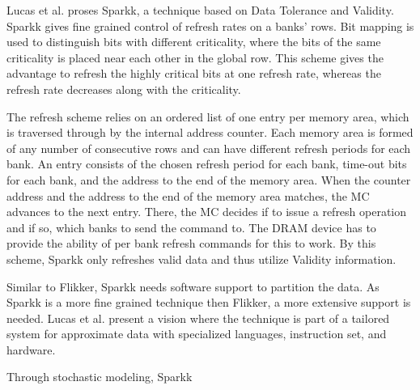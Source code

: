 Lucas et al. \cite{sparkk} proses Sparkk, a technique based on Data Tolerance and Validity. Sparkk gives fine grained control of refresh rates on a banks' rows. Bit mapping is used to distinguish bits with different criticality, where the bits of the same criticality is placed near each other in the global row. This scheme gives the advantage to refresh the highly critical bits at one refresh rate, whereas the refresh rate decreases along with the criticality. 

The refresh scheme relies on an ordered list of one entry per memory area, which is traversed through by the internal address counter. Each memory area is formed of any number of consecutive rows and can have different refresh periods for each bank. An entry consists of the chosen refresh period for each bank, time-out bits for each bank, and the address to the end of the memory area. When the counter address and the address to the end of the memory area matches, the MC advances to the next entry. There, the MC decides if to issue a refresh operation and if so, which banks to send the command to. The DRAM device has to provide the ability of per bank refresh commands for this to work. By this scheme, Sparkk only refreshes valid data and thus utilize Validity information. 

Similar to Flikker, Sparkk needs software support to partition the data. As Sparkk is a more fine grained technique then Flikker, a more extensive support is needed. Lucas et al. present a vision where the technique is part of a tailored system for approximate data with specialized languages, instruction set, and hardware. 


Through stochastic modeling, Sparkk  
